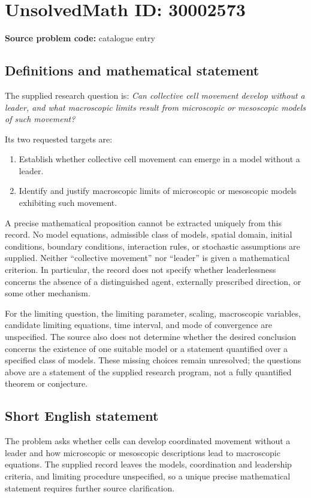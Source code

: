 \documentclass[11pt]{article}
\begin{document}
\section*{UnsolvedMath ID: 30002573}
\textbf{Source problem code:} catalogue entry
\subsection{Definitions and mathematical statement}
The supplied research question is: \emph{Can collective cell movement develop without a leader, and what macroscopic limits result from microscopic or mesoscopic models of such movement?}

Its two requested targets are:
\begin{enumerate}
\item Establish whether collective cell movement can emerge in a model without a leader.
\item Identify and justify macroscopic limits of microscopic or mesoscopic models exhibiting such movement.
\end{enumerate}

A precise mathematical proposition cannot be extracted uniquely from this record. No model equations, admissible class of models, spatial domain, initial conditions, boundary conditions, interaction rules, or stochastic assumptions are supplied. Neither ``collective movement'' nor ``leader'' is given a mathematical criterion. In particular, the record does not specify whether leaderlessness concerns the absence of a distinguished agent, externally prescribed direction, or some other mechanism.

For the limiting question, the limiting parameter, scaling, macroscopic variables, candidate limiting equations, time interval, and mode of convergence are unspecified. The source also does not determine whether the desired conclusion concerns the existence of one suitable model or a statement quantified over a specified class of models. These missing choices remain unresolved; the questions above are a statement of the supplied research program, not a fully quantified theorem or conjecture.
\subsection{Short English statement}
The problem asks whether cells can develop coordinated movement without a leader and how microscopic or mesoscopic descriptions lead to macroscopic equations. The supplied record leaves the models, coordination and leadership criteria, and limiting procedure unspecified, so a unique precise mathematical statement requires further source clarification.
\end{document}
